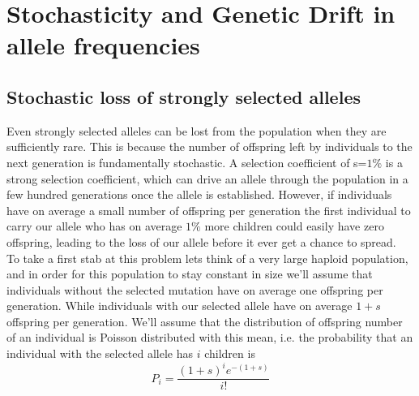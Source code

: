 \section{Stochasticity and Genetic Drift in allele frequencies}
\subsection{Stochastic loss of strongly selected alleles}
Even strongly selected alleles can be lost from the population when
they are sufficiently rare. This is because the number of offspring
left by individuals to the next generation is fundamentally
stochastic. A selection coefficient of s=$1\%$ is a strong
selection coefficient, which can drive an allele through the
population in a few hundred generations once the allele is
established. However, if individuals have on average a small number of
offspring per generation the first individual to carry our allele who
has on average $1\%$ more children could easily have zero offspring, leading to the loss
of our allele before it ever get a chance to spread.\\

To take a first stab at this problem lets think of a very large
haploid population, and in order for this population to stay constant in size
we'll assume that individuals without the selected mutation have on average one
offspring per generation. While individuals with our selected allele
have on average $1+s$ offspring per generation. We'll assume that the
distribution of offspring number of an individual is Poisson
distributed with this mean, i.e. the probability that an individual
with the selected allele has $i$ children is
\begin{equation}
P_i= \frac{(1+s)^i e^{-(1+s)}}{i!}
\end{equation}


